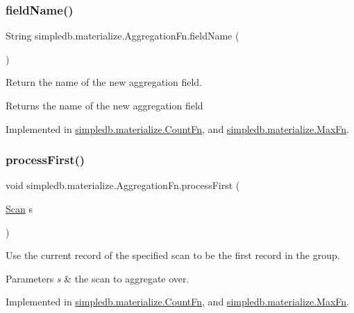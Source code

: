 \subsubsection{\texorpdfstring{field\+Name()}{fieldName()}}
{\footnotesize\ttfamily String simpledb.\+materialize.\+Aggregation\+Fn.\+field\+Name (\begin{DoxyParamCaption}{ }\end{DoxyParamCaption})}

Return the name of the new aggregation field. \begin{DoxyReturn}{Returns}
the name of the new aggregation field 
\end{DoxyReturn}


Implemented in \hyperlink{classsimpledb_1_1materialize_1_1CountFn_a283e9fa1325fd5f81821ef3d3fdcec27}{simpledb.\+materialize.\+Count\+Fn}, and \hyperlink{classsimpledb_1_1materialize_1_1MaxFn_a51dc995821073599a8780df18b86ae9f}{simpledb.\+materialize.\+Max\+Fn}.

\mbox{\label{interfacesimpledb_1_1materialize_1_1AggregationFn_abc424e0873445d14786ae0f3c539c80f}} 
\subsubsection{\texorpdfstring{process\+First()}{processFirst()}}
{\footnotesize\ttfamily void simpledb.\+materialize.\+Aggregation\+Fn.\+process\+First (\begin{DoxyParamCaption}\item[{\hyperlink{interfacesimpledb_1_1query_1_1Scan}{Scan}}]{s }\end{DoxyParamCaption})}

Use the current record of the specified scan to be the first record in the group. 
\begin{DoxyParams}{Parameters}
{\em s} & the scan to aggregate over. \\
\hline
\end{DoxyParams}


Implemented in \hyperlink{classsimpledb_1_1materialize_1_1CountFn_ad2de83ee6906e5407cad7e8f2b2c9e42}{simpledb.\+materialize.\+Count\+Fn}, and \hyperlink{classsimpledb_1_1materialize_1_1MaxFn_aeb7c0c3b7beddb944fac6f843f288cae}{simpledb.\+materialize.\+Max\+Fn}.

